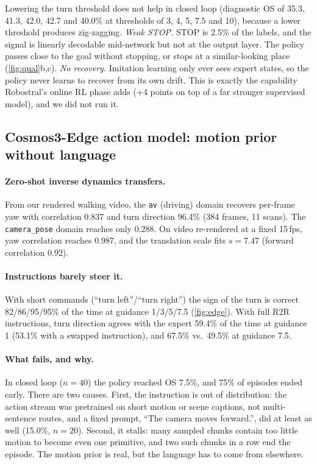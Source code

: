\documentclass[11pt]{article}
\begin{document}
Lowering the turn threshold does not help in closed loop (diagnostic OS of 35.3, 41.3, 42.0, 42.7 and 40.0\% at thresholds of 3, 4, 5, 7.5 and 10\textdegree), because a lower threshold produces zig-zagging. \emph{Weak STOP.} STOP is 2.5\% of the labels, and the signal is linearly decodable mid-network but not at the
output layer. The policy passes close to the goal without stopping, or stops at a similar-looking place
(\cref{fig:qual}b,c). \emph{No recovery.} Imitation learning only ever sees expert states, so the policy never learns to
recover from its own drift. This is exactly the capability Robostral's online RL phase adds (+4 points on top of a far
stronger supervised model), and we did not run it.

\subsection{Cosmos3-Edge action model: motion prior without language}
\label{sec:res-edge}

\paragraph{Zero-shot inverse dynamics transfers.}
From our rendered walking video, the \texttt{av} (driving) domain recovers per-frame yaw with correlation 0.837 and
turn direction 96.4\% (384 frames, 11 scans). The \texttt{camera\_pose} domain reaches only 0.288. On video
re-rendered at a fixed 15\,fps, yaw correlation reaches 0.987, and the translation scale fits $s{=}7.47$
(forward correlation 0.92).

\paragraph{Instructions barely steer it.}
With short commands (``turn left''/``turn right'') the sign of the turn is correct 82/86/95/95\% of the time at
guidance 1/3/5/7.5 (\cref{fig:edge}). With full R2R instructions, turn direction agrees with the expert 59.4\% of the
time at guidance 1 (53.1\% with a swapped instruction), and 67.5\% vs.\ 49.5\% at guidance 7.5.

\paragraph{What fails, and why.}
In closed loop ($n{=}40$) the policy reached OS 7.5\%, and 75\% of episodes ended early. There are two causes. First,
the instruction is out of distribution: the action stream was pretrained on short motion or scene captions, not
multi-sentence routes, and a fixed prompt, ``The camera moves forward.'', did at least as well (15.0\%, $n{=}20$).
Second, it stalls: many sampled chunks contain too little motion to become even one primitive, and two such chunks in
a row end the episode. The motion prior is real, but the language has to come from elsewhere.
\end{document}

